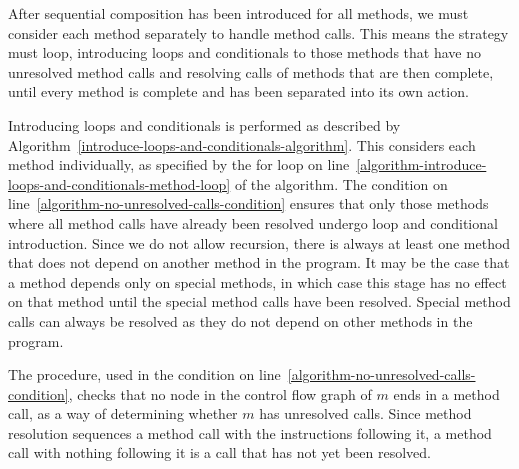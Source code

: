 After sequential composition has been introduced for all methods, we
must consider each method separately to handle method calls.
This means the strategy must loop, introducing loops and conditionals
to those methods that have no unresolved method calls and resolving
calls of methods that are then complete, until every method is
complete and has been separated into its own action.

Introducing loops and conditionals is performed as described by
Algorithm~\ref{introduce-loops-and-conditionals-algorithm}.
This considers each method individually, as specified by the for loop
on line~\ref{algorithm-introduce-loops-and-conditionals-method-loop}
of the algorithm. 
The condition on line~\ref{algorithm-no-unresolved-calls-condition}
ensures that only those methods where all method calls have already
been resolved undergo loop and conditional introduction.
Since we do not allow recursion, there is always at least one method
that does not depend on another method in the program.
It may be the case that a method depends only on special methods, in
which case this stage has no effect on that method until the special
method calls have been resolved.
Special method calls can always be resolved as they do not depend on
other methods in the program.

The  procedure, used in the condition
on line~\ref{algorithm-no-unresolved-calls-condition}, checks that no
node in the control flow graph of $m$ ends in a method call, as a way
of determining whether $m$ has unresolved calls.
Since method resolution sequences a method call with the instructions
following it, a method call with nothing following it is a call that
has not yet been resolved.

